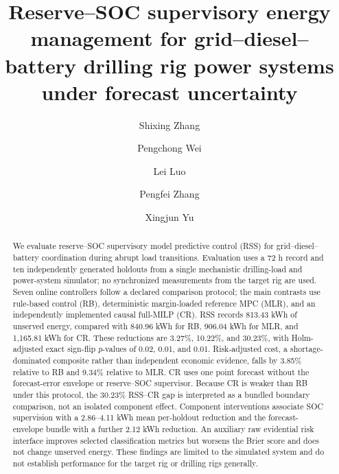 \documentclass[preprint,12pt]{elsarticle}
\DeclareRobustCommand{\?}[1]{\u{#1}}
\DeclareRobustCommand{\>}[1]{\c{#1}}
\begin{document}
\begin{frontmatter}

\title{Reserve--SOC supervisory energy management for grid--diesel--battery drilling rig power systems under forecast uncertainty}

\author[aff1,aff2]{Shixing Zhang}
\author[aff1,aff2]{Pengchong Wei}
\author[aff1,aff2]{Lei Luo}
\author[aff1,aff2]{Pengfei Zhang}
\author[aff1,aff2]{Xingjun Yu}



\begin{abstract}
We evaluate reserve--SOC supervisory model predictive control (RSS) for
grid--diesel--battery coordination during abrupt load transitions. Evaluation
uses a 72 h record and ten independently
generated holdouts from a single mechanistic drilling-load and power-system
simulator; no synchronized measurements from the target rig are used. Seven
online controllers follow a declared comparison protocol; the main contrasts
use rule-based control (RB), deterministic margin-loaded
reference MPC (MLR), and an independently implemented causal full-MILP (CR).
RSS records 813.43 kWh of unserved energy, compared with 840.96 kWh for RB,
906.04 kWh for MLR, and 1,165.81 kWh for CR. These reductions are
3.27\%, 10.22\%, and 30.23\%, with Holm-adjusted exact sign-flip $p$-values of
0.02, 0.01, and 0.01. Risk-adjusted cost, a shortage-dominated composite rather
than independent economic evidence, falls by 3.85\% relative to RB and 9.34\%
relative to MLR. CR uses one point forecast without the forecast-error envelope
or reserve--SOC supervisor. Because CR is weaker than RB under
this protocol, the 30.23\% RSS--CR gap is interpreted as a bundled boundary
comparison, not an isolated component effect. Component interventions associate
SOC supervision with a 2.86--4.11 kWh mean per-holdout reduction and the
forecast-envelope bundle with a further 2.12 kWh reduction. An auxiliary raw
evidential risk interface improves selected classification metrics but worsens
the Brier score and does not change unserved energy. These findings are limited
to the simulated system and do not establish performance for the target rig or
drilling rigs generally.
\end{abstract}


\end{frontmatter}
\end{document}
